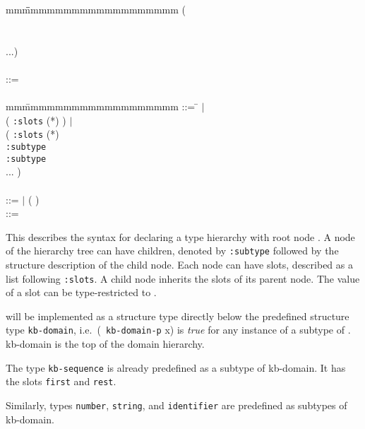 \begin{tabbing}
mm\=\=mmmmmmmmmmmmmmmmmmm\kill
  \>( \\
  \>  \\
  \>  \\
  \>\> ...) \\
\\
  \> ::=  \\
\\
mm\=mmmmmmmmmmmmmmmmmmm\kill
  \> ::= \=  $|$ \\
  \> \>(  {\tt :slots} (*) ) $|$ \\
  \> \>(  \= {\tt :slots} (*) \\
  \> \>                   \> {\tt :subtype}  \\
  \> \>                   \> {\tt :subtype}  \\
  \> \> ... )\\
\\
  \>  ::=  $|$ (  
 ) \\
  \>  ::= 
\end{tabbing}

This describes the syntax for declaring a type hierarchy with root
node .  A node of the hierarchy tree can have
children, denoted by {\tt :subtype} followed by the structure
description of the child node.  Each node can have slots, described as
a list following {\tt :slots}.  A child node inherits the slots of its
parent node.  The value of a slot can be type-restricted to
.

 will be implemented as a structure type directly
below the predefined structure type {\tt kb-domain}, i.e.\ ({\tt
kb-domain-p} x) is {\em true} for any instance of a subtype of
.  kb-domain is the top of the domain
hierarchy.   

The type {\tt kb-sequence} is already predefined as a subtype of
kb-domain.  It has the slots {\tt first} and {\tt rest}.

Similarly, types {\tt number}, {\tt string}, and {\tt identifier} are
predefined as subtypes of kb-domain.

